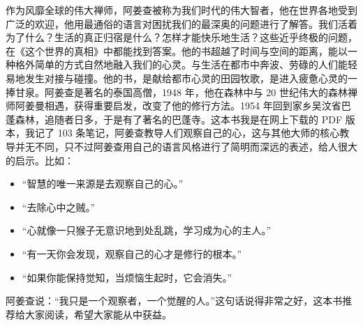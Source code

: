 \begin{book}
    作为风靡全球的伟大禅师，阿姜查被称为我们时代的伟大智者，他在世界各地受到广泛的欢迎，他用最通俗的语言对困扰我们的最深奥的问题进行了解答。我们活着为了什么？生活的真正归宿是什么？怎样才能快乐地生活？这些近乎终极的问题，在《这个世界的真相》中都能找到答案。他的书超越了时间与空间的距离，能以一种格外简单的方式自然地融入我们的心灵。与生活在都市中奔波、劳碌的人们能轻易地发生对接与碰撞。他的书，是献给都市心灵的田园牧歌，是进入疲惫心灵的一捧甘泉。阿姜查是著名的泰国高僧，1948 年，他在森林中与 20 世纪伟大的森林禅师阿姜曼相遇，获得重要启发，改变了他的修行方法。1954 年回到家乡吴汶省巴蓬森林，追随者日多，于是有了著名的巴蓬寺。这本书我是在网上下载的 PDF 版本，我记了 103 条笔记，阿姜查教导人们观察自己的心，这与其他大师的核心教导并无不同，只不过阿姜查用自己的语言风格进行了简明而深远的表述，给人很大的启示。比如：\begin{itemize}
        \item “智慧的唯一来源是去观察自己的心。”
        \item “去除心中之贼。”
        \item “心就像一只猴子无意识地到处乱跳，学习成为心的主人。”
        \item “有一天你会发现，观察自己的心才是修行的根本。”
        \item “如果你能保持觉知，当烦恼生起时，它会消失。”
    \end{itemize} 阿姜查说：“我只是一个观察者，一个觉醒的人。”这句话说得非常之好，这本书推荐给大家阅读，希望大家能从中获益。
\end{book}
